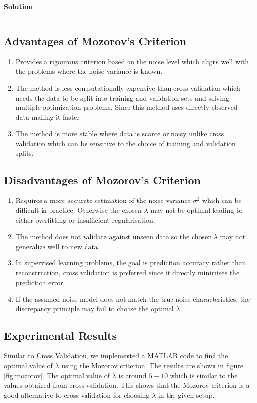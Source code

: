 \documentclass[a4paper,12pt]{article}
\newenvironment{solution}[2][]{%
    \begin{mdframed}[linecolor=blue!70!black, linewidth=2pt, roundcorner=10pt, backgroundcolor=yellow!10!white, skipabove=12pt, skipbelow=12pt]%
        \textbf{\large #2}
        \par\noindent\rule{\textwidth}{0.4pt}
}{
    \end{mdframed}
}
\begin{document}
\begin{solution}{Solution}
  \subsection{Advantages of Mozorov's Criterion}
  \begin{enumerate}
    \item Provides a rigourous criterion based on the noise level which aligns well with the problems where the noise variance is known.
    \item The method is less computationally expensive than cross-validation which needs the data to be split into training and validation sets and solving multiple optimization problems. Since this method uses directly observed data making it faster
    \item The method is more stable where data is scarce or noisy unlike cross validation which can be sensitive to the choice of training and validation splits.
  \end{enumerate}

  \subsection{Disadvantages of Mozorov's Criterion}
  \begin{enumerate}
    \item Requires a more accurate estimation of the noise variance $\sigma^2$ which can be difficult in practice. Otherwise the chosen $\lambda$ may not be optimal leading to either overfitting or insufficient regularisation.
    \item The method does not validate against unseen data so the chosen $\lambda$ may not generalize well to new data.
    \item In supervised learning problems, the goal is prediction accuracy rather than reconstruction, cross validation is preferred since it directly minimises the prediction error.
    \item If the assumed noise model does not match the true noise characteristics, the discrepancy principle may fail to choose the optimal $\lambda$.
  \end{enumerate}

  \subsection{Experimental Results}

  \noindent Similar to Cross Validation, we implemented a MATLAB code to find the optimal value of $\lambda$ using the Mozorov criterion. The results are shown in figure \ref{fig:mozorov}. The optimal value of $\lambda$ is around $5-10$ which is similar to the values obtained from cross validation. This shows that the Mozorov criterion is a good alternative to cross validation for choosing $\lambda$ in the given setup. 


\end{solution}
\end{document}
